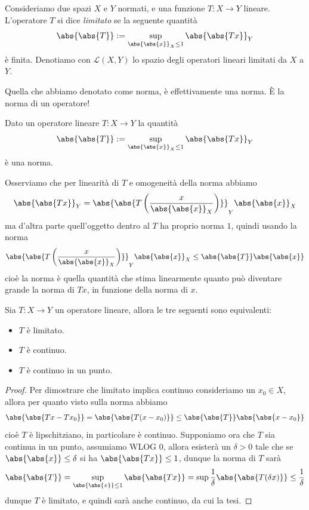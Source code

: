 \documentclass[11pt]{scrartcl}
\begin{document}
	\begin{definition}
		Consideriamo due spazi $X$ e $Y$ normati, e una funzione $T:X\to Y$ lineare. L'operatore $T$ si dice \textit{limitato} se la seguente quantità
		$$\abs{\abs{T}}:=\sup_{\abs{\abs{x}}_X\le 1}\abs{\abs{Tx}}_Y$$
		è finita. Denotiamo con $\mathcal{L}(X,Y)$ lo spazio degli operatori lineari limitati da $X$ a $Y$.
	\end{definition}
	Quella che abbiamo denotato come norma, è effettivamente una norma. \`E la norma di un operatore! 
	\begin{proposition}
		Dato un operatore lineare $T:X\to Y$ la quantità
		$$\abs{\abs{T}}:=\sup_{\abs{\abs{x}}_X\le 1}\abs{\abs{Tx}}_Y$$
		è una norma.
	\end{proposition}
	Osserviamo che per linearità di $T$ e omogeneità della norma abbiamo
	$$\abs{\abs{Tx}}_Y=\abs{\abs{T\left(\frac{x}{\abs{\abs{x}}_X}\right)}}_Y\abs{\abs{x}}_X$$
	ma d'altra parte quell'oggetto dentro al $T$ ha proprio norma $1$, quindi usando la norma
	$$\abs{\abs{T\left(\frac{x}{\abs{\abs{x}}_X}\right)}}_Y\abs{\abs{x}}_X\le \abs{\abs{T}}\abs{\abs{x}}$$
	cioè la norma è quella quantità che stima linearmente quanto può diventare grande la norma di $Tx$, in funzione della norma di $x$.
	\begin{proposition}
		Sia $T:X\to Y$ un operatore lineare, allora le tre seguenti sono equivalenti:
		\begin{itemize}
			\item $T$ è limitato.
			\item $T$ è continuo.
			\item $T$ è continuo in un punto.
		\end{itemize}
	\end{proposition}
	\begin{proof}
		Per dimostrare che limitato implica continuo consideriamo un $x_0\in X$, allora per quanto visto sulla norma abbiamo
		$$\abs{\abs{Tx-Tx_0}}=\abs{\abs{T(x-x_0)}}\le \abs{\abs{T}}\abs{\abs{x-x_0}}$$
		cioè $T$ è lipschitziano, in particolare è continuo. Supponiamo ora che $T$ sia continua in un punto, assumiamo WLOG $0$, allora esisterà un $\delta>0$ tale che se $\abs{\abs{x}}\le \delta$ si ha $\abs{\abs{Tx}}\le 1$, dunque la norma di $T$ sarà
		$$\abs{\abs{T}}=\sup_{\abs{\abs{x}}\le 1}\abs{\abs{Tx}}=\sup \frac{1}{\delta}\abs{\abs{T(\delta x)}}\le \frac{1}{\delta}$$
		dunque $T$ è limitato, e quindi sarà anche continuo, da cui la tesi.
	\end{proof}
\end{document}
